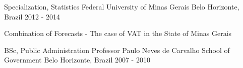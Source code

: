 \begin{cventries}
  \cventry
    {Specialization, Statistics}
    {Federal University of Minas Gerais}
    {Belo Horizonte, Brazil}
    {2012 - 2014}
    {
      \begin{cvitems}
        \item {Combination of Forecasts - The case of VAT in the State of Minas Gerais}
      \end{cvitems}
    }
  \cventry
    {BSc, Public Administration}
    {Professor Paulo Neves de Carvalho School of Government}
    {Belo Horizonte, Brazil}
    {2007 - 2010}
    {
      \begin{cvitems}
      \end{cvitems}
    }
\end{cventries}
